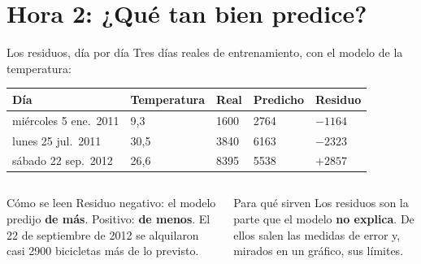\documentclass[aspectratio=169,11pt]{beamer}
\begin{document}
\section{Hora 2: ¿Qué tan bien predice?}
\begin{frame}[t]{Los residuos, día por día}
  \small
  Tres días reales de entrenamiento, con el modelo de la temperatura:
  \vspace{0.1cm}
  \footnotesize
  \renewcommand{\arraystretch}{1.2}
  \begin{tabular}{@{}L{3.6cm}R{1.8cm}R{1.7cm}R{1.9cm}R{1.7cm}@{}}
    \toprule
    \textbf{Día} & \textbf{Temperatura} & \textbf{Real} & \textbf{Predicho} & \textbf{Residuo} \\
    \midrule
    miércoles 5 ene.\ 2011 & 9,3 & 1600 & 2764 & $-1164$ \\
    lunes 25 jul.\ 2011 & 30,5 & 3840 & 6163 & $-2323$ \\
    sábado 22 sep.\ 2012 & 26,6 & 8395 & 5538 & $+2857$ \\
    \bottomrule
  \end{tabular}
  \vspace{0.15cm}
  \begin{columns}[T,onlytextwidth]
    \begin{block}{Cómo se leen}
      \footnotesize Residuo negativo: el modelo predijo \textbf{de más}.
      Positivo: \textbf{de menos}. El 22 de septiembre de 2012 se alquilaron
      casi 2900 bicicletas más de lo previsto.
    \end{block}
    \begin{block}{Para qué sirven}
      \footnotesize Los residuos son la parte que el modelo
      \textbf{no explica}. De ellos salen las medidas de error y, mirados
      en un gráfico, sus límites.
    \end{block}
  \end{columns}
\end{frame}
\end{document}
